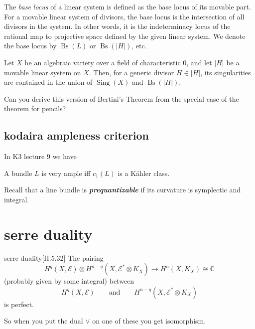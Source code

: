 The \emph{base locus} of a linear system is defined as the base locus of its movable part. For a movable linear system of divisors, the base locus is the intersection of all divisors in the system. In other words, it is the indeterminacy locus of the rational map to projective space defined by the given linear system. We denote the base locus by \( \operatorname{Bs}(L) \) or \( \operatorname{Bs}(|H|) \), etc.

\begin{thm}[Bertini]
Let \( X \) be an algebraic variety over a field of characteristic 0, and let \( |H| \) be a movable linear system on \( X \). Then, for a generic divisor \( H \in |H| \), its singularities are contained in the union of \( \operatorname{Sing}(X) \) and \( \operatorname{Bs}(|H|) \).
\end{thm}

\begin{exercise}
Can you derive this version of Bertini’s Theorem from the special case of the theorem for pencils?
\end{exercise}

\subsection{kodaira ampleness criterion}

In K3 lecture 9 we have

\begin{thm}[Kodaira]\leavevmode
A bundle \(L\) is very ample iff \(c_1(L)\) is a Kähler class.
\end{thm}

\begin{thing7}{Recall}\leavevmode
that a line bundle is \textit{\textbf{prequantizable}} if its curvature is symplectic and integral.
\end{thing7}

\section{serre duality}
\begin{thing6}{serre duality}[II.5.32\cite{voi}]\label{thm:5.32}\leavevmode
The pairing
\[H^{q}(X,\mathcal{E})\otimes H^{n-q}(X,\mathcal{E}^*\otimes K_X)\to H^{n}(X,K_X)\cong\mathbb{C}\]
(probably given by some integral) between
\[H^{q}(X,\mathcal{E})\qquad \text{and} \qquad H^{n-q}(X,\mathcal{E}^* \otimes K_X)\]
is perfect.
\end{thing6}
So when you put the dual \(\vee\) on one of these you get isomorphism.


